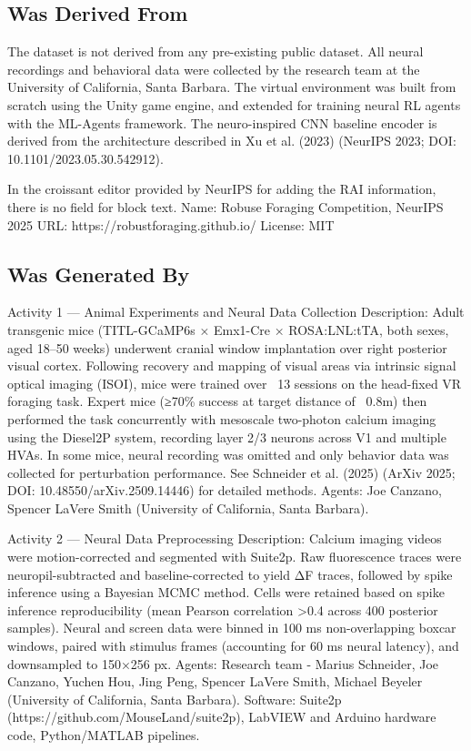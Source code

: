 \subsection{Was Derived From}
The dataset is not derived from any pre-existing public dataset. All neural recordings and behavioral data were collected by the research team at the University of California, Santa Barbara. The virtual environment was built from scratch using the Unity game engine, and extended for training neural RL agents with the ML-Agents framework. The neuro-inspired CNN baseline encoder is derived from the architecture described in Xu et al. (2023) (NeurIPS 2023; DOI: 10.1101/2023.05.30.542912). 

In the croissant editor provided by NeurIPS for adding the RAI information, there is no field for block text. 
Name: Robuse Foraging Competition, NeurIPS 2025
URL: https://robustforaging.github.io/
License: MIT

\subsection{Was Generated By}
Activity 1 — Animal Experiments and Neural Data Collection
Description: Adult transgenic mice (TITL-GCaMP6s × Emx1-Cre × ROSA:LNL:tTA, both sexes, aged 18–50 weeks) underwent cranial window implantation over right posterior visual cortex. Following recovery and mapping of visual areas via intrinsic signal optical imaging (ISOI), mice were trained over ~13 sessions on the head-fixed VR foraging task. Expert mice (≥70\% success at target distance of ~0.8m) then performed the task concurrently with mesoscale two-photon calcium imaging using the Diesel2P system, recording layer 2/3 neurons across V1 and multiple HVAs. In some mice, neural recording was omitted and only behavior data was collected for perturbation performance. See Schneider et al. (2025) (ArXiv 2025; DOI: 10.48550/arXiv.2509.14446) for detailed methods.
Agents:  Joe Canzano, Spencer LaVere Smith (University of California, Santa Barbara). 

Activity 2 — Neural Data Preprocessing
Description: Calcium imaging videos were motion-corrected and segmented with Suite2p. Raw fluorescence traces were neuropil-subtracted and baseline-corrected to yield ΔF traces, followed by spike inference using a Bayesian MCMC method. Cells were retained based on spike inference reproducibility (mean Pearson correlation >0.4 across 400 posterior samples). Neural and screen data were binned in 100 ms non-overlapping boxcar windows, paired with stimulus frames (accounting for 60 ms neural latency), and downsampled to 150×256 px. 
Agents: Research team - Marius Schneider, Joe Canzano, Yuchen Hou, Jing Peng, Spencer LaVere Smith, Michael Beyeler (University of California, Santa Barbara). 
Software: Suite2p (https://github.com/MouseLand/suite2p), LabVIEW and Arduino hardware code, Python/MATLAB pipelines.

